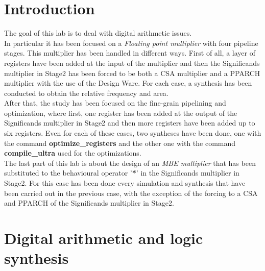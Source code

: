 \documentclass[a4paper, titlepage]{article}
\begin{document}
\section{Introduction}
The goal of this lab is to deal with digital arithmetic issues.\\In particular it has been focused on a \textit{Floating point multiplier} with four pipeline stages. This multiplier has been handled in different ways. First of all, a layer of registers have been added at the input of the multiplier and then the Significands multiplier in Stage2 has been forced to be both a CSA multiplier and a PPARCH multiplier with the use of the Design Ware. For each case, a synthesis has been conducted to obtain the relative frequency and area.\\After that, the study has been focused on the fine-grain pipelining and optimization, where first, one register has been added at the output of the Significands multiplier in Stage2 and then more registers have been added up to six registers. Even for each of these cases, two syntheses have been done, one with the command \textbf{optimize\_registers} and the other one with the command \textbf{compile\_ultra} used for the optimizations.\\The last part of this lab is about the design of an \textit{MBE multiplier} that has been substituted to the behavioural operator '\textbf{*}' in the Significands multiplier in Stage2. For this case has been done every simulation and synthesis that have been carried out in the previous case, with the exception of the forcing to a CSA and PPARCH of the Significands multiplier in Stage2.
\section{Digital arithmetic and logic synthesis}
\end{document}
